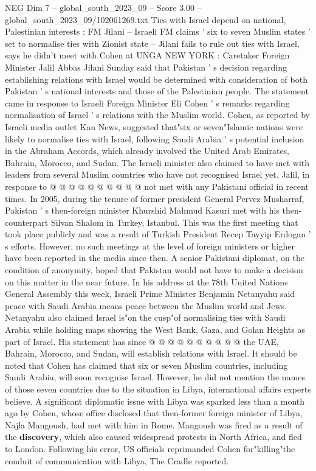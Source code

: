\begin{textsample}{NEG Dim 7 – global\_south\_2023\_09 – Score 3.00 – global\_south\_2023\_09/102061269.txt}  \label{ex:f7_neg_445}
Ties with Israel depend on national, Palestinian interests : FM Jilani -- Israeli FM claims ' six to seven Muslim states ' set to normalise ties with Zionist state -- Jilani fails to rule out ties with Israel, says he didn't meet with Cohen at UNGA NEW YORK : Caretaker Foreign Minister Jalil Abbas Jilani Sunday said that Pakistan ' s decision regarding establishing relations with Israel would be determined with consideration of both Pakistan ' s national interests and those of the Palestinian people.
The statement came in response to Israeli Foreign Minister Eli Cohen ' s remarks regarding normalisation of Israel ' s relations with the Muslim world.
Cohen, as reported by Israeli media outlet Kan News, suggested that"six or seven"Islamic nations were likely to normalise ties with Israel, following Saudi Arabia ' s potential inclusion in the Abraham Accords, which already involved the United Arab Emirates, Bahrain, Morocco, and Sudan.
The Israeli minister also claimed to have met with leaders from several Muslim countries who have not recognised Israel yet.
Jalil, in response to @ @ @ @ @ @ @ @ @ @ not met with any Pakistani official in recent times.
In 2005, during the tenure of former president General Pervez Musharraf, Pakistan ' s then-foreign minister Khurshid Mahmud Kasuri met with his then-counterpart Silvan Shalom in Turkey, Istanbul.
This was the first meeting that took place publicly and was a result of Turkish President Recep Tayyip Erdogan ' s efforts.
However, no such meetings at the level of foreign ministers or higher have been reported in the media since then.
A senior Pakistani diplomat, on the condition of anonymity, hoped that Pakistan would not have to make a decision on this matter in the near future.
In his address at the 78th United Nations General Assembly this week, Israeli Prime Minister Benjamin Netanyahu said peace with Saudi Arabia means peace between the Muslim world and Jews.
Netanyahu also claimed Israel is"on the cusp"of normalising ties with Saudi Arabia while holding maps showing the West Bank, Gaza, and Golan Heights as part of Israel.
His statement has since @ @ @ @ @ @ @ @ @ @ the UAE, Bahrain, Morocco, and Sudan, will establish relations with Israel.
It should be noted that Cohen has claimed that six or seven Muslim countries, including Saudi Arabia, will soon recognise Israel.
However, he did not mention the names of those seven countries due to the situation in Libya, international affairs experts believe.
A significant diplomatic issue with Libya was sparked less than a month ago by Cohen, whose office disclosed that then-former foreign minister of Libya, Najla Mangoush, had met with him in Rome.
Mangoush was fired as a result of the \textbf{discovery}, which also caused widespread protests in North Africa, and fled to London.
Following his error, US officials reprimanded Cohen for"killing"the conduit of communication with Libya, The Cradle reported.

\end{textsample}
